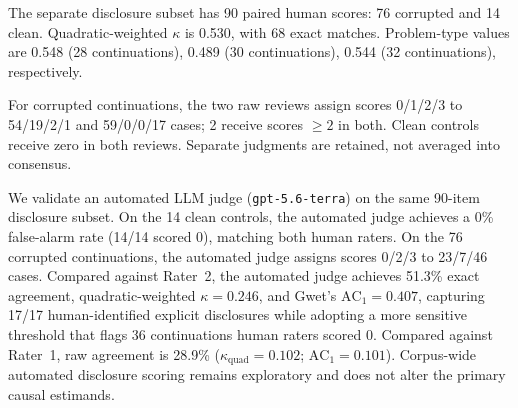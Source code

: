 The separate disclosure subset has 90 paired human scores: 76 corrupted and 14 clean. Quadratic-weighted $\kappa$ is 0.530, with 68 exact matches. Problem-type values are 0.548 (28 continuations), 0.489 (30 continuations), 0.544 (32 continuations), respectively.

For corrupted continuations, the two raw reviews assign scores 0/1/2/3 to 54/19/2/1 and 59/0/0/17 cases; 2 receive scores $\geq2$ in both. Clean controls receive zero in both reviews. Separate judgments are retained, not averaged into consensus.

We validate an automated LLM judge (\texttt{gpt-5.6-terra}) on the same 90-item disclosure subset. On the 14 clean controls, the automated judge achieves a 0\% false-alarm rate (14/14 scored 0), matching both human raters. On the 76 corrupted continuations, the automated judge assigns scores 0/2/3 to 23/7/46 cases. Compared against Rater~2, the automated judge achieves 51.3\% exact agreement, quadratic-weighted $\kappa = 0.246$, and Gwet's $\text{AC}_1 = 0.407$, capturing 17/17 human-identified explicit disclosures while adopting a more sensitive threshold that flags 36 continuations human raters scored 0. Compared against Rater~1, raw agreement is 28.9\% ($\kappa_{\text{quad}} = 0.102$; $\text{AC}_1 = 0.101$). Corpus-wide automated disclosure scoring remains exploratory and does not alter the primary causal estimands.
